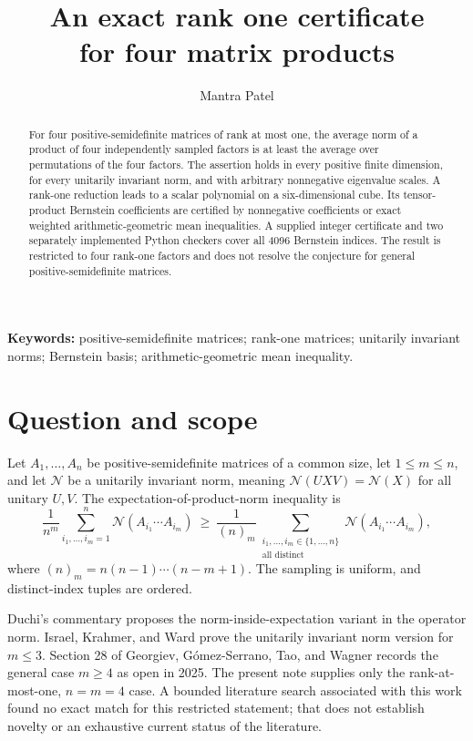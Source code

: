 \documentclass[11pt,letterpaper]{article}
\title{An exact rank one certificate\\for four matrix products}
\author{Mantra Patel}
\date{}
\newcommand{\N}{\mathcal N}
\begin{document}
\maketitle
\begin{abstract}
For four positive-semidefinite matrices of rank at most one, the average norm of a product of four independently sampled factors is at least the average over permutations of the four factors. The assertion holds in every positive finite dimension, for every unitarily invariant norm, and with arbitrary nonnegative eigenvalue scales. A rank-one reduction leads to a scalar polynomial on a six-dimensional cube. Its tensor-product Bernstein coefficients are certified by nonnegative coefficients or exact weighted arithmetic-geometric mean inequalities. A supplied integer certificate and two separately implemented Python checkers cover all 4096 Bernstein indices. The result is restricted to four rank-one factors and does not resolve the conjecture for general positive-semidefinite matrices.
\end{abstract}
\noindent\textbf{Keywords:} positive-semidefinite matrices; rank-one matrices; unitarily invariant norms; Bernstein basis; arithmetic-geometric mean inequality.


\section{Question and scope}
Let $A_1,\ldots,A_n$ be positive-semidefinite matrices of a common size, let $1\le m\le n$, and let $\N$ be a unitarily invariant norm, meaning $\N(UXV)=\N(X)$ for all unitary $U,V$. The expectation-of-product-norm inequality is
\begin{equation}\label{eq:general}
\frac{1}{n^m}\sum_{i_1,\ldots,i_m=1}^n
 \N(A_{i_1}\cdots A_{i_m})
\ \ge\ \frac{1}{(n)_m}\sum_{\substack{i_1,\ldots,i_m\in\{1,\ldots,n\}\\\text{all distinct}}}
 \N(A_{i_1}\cdots A_{i_m}),
\end{equation}
where $(n)_m=n(n-1)\cdots(n-m+1)$. The sampling is uniform, and distinct-index tuples are ordered.

Duchi's commentary \cite{duchi} proposes the norm-inside-expectation variant in the operator norm. Israel, Krahmer, and Ward \cite{ikw} prove the unitarily invariant norm version for $m\le3$. Section 28 of Georgiev, G\'omez-Serrano, Tao, and Wagner \cite{ggtw} records the general case $m\ge4$ as open in 2025. The present note supplies only the rank-at-most-one, $n=m=4$ case. A bounded literature search associated with this work found no exact match for this restricted statement; that does not establish novelty or an exhaustive current status of the literature.
\end{document}
